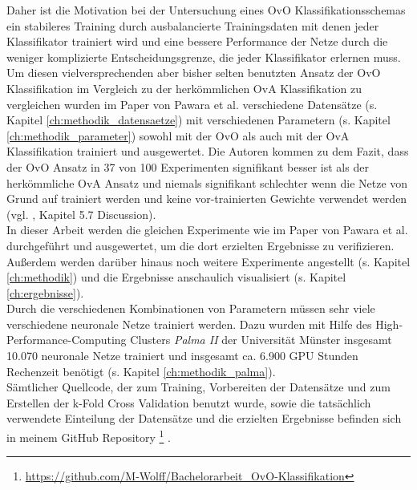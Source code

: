 Daher ist die Motivation bei der Untersuchung eines OvO Klassifikationsschemas ein stabileres Training durch ausbalancierte Trainingsdaten mit denen jeder Klassifikator trainiert wird und eine bessere Performance der Netze durch die weniger komplizierte  Entscheidungsgrenze, die jeder Klassifikator erlernen muss.\\

Um diesen vielversprechenden aber bisher selten benutzten Ansatz der OvO Klassifikation im Vergleich zu der herkömmlichen OvA Klassifikation zu vergleichen wurden im Paper von Pawara et al. \cite{pawaraPaper} verschiedene Datensätze (s. Kapitel \ref{ch:methodik_datensaetze}) mit verschiedenen Parametern (s. Kapitel \ref{ch:methodik_parameter}) sowohl mit der OvO als auch mit der OvA Klassifikation trainiert und ausgewertet.
Die Autoren kommen zu dem Fazit, dass der OvO Ansatz in 37 von 100 Experimenten signifikant besser ist als der herkömmliche OvA Ansatz und niemals signifikant schlechter wenn die Netze von Grund auf trainiert werden und keine vor-trainierten Gewichte verwendet werden (vgl. \cite{pawaraPaper}, Kapitel 5.7 Discussion).\\

In dieser Arbeit werden die gleichen Experimente wie im Paper von Pawara et al. \cite{pawaraPaper} durchgeführt und ausgewertet, um die dort erzielten Ergebnisse zu verifizieren. Außerdem werden darüber hinaus noch weitere Experimente angestellt (s. Kapitel \ref{ch:methodik}) und die Ergebnisse anschaulich visualisiert (s. Kapitel \ref{ch:ergebnisse}).\\

Durch die verschiedenen Kombinationen von Parametern müssen sehr viele verschiedene neuronale Netze trainiert werden. Dazu wurden mit Hilfe des High-Performance-Computing Clusters \textit{Palma II} der Universität Münster \cite{palma2} insgesamt 10.070 neuronale Netze trainiert und insgesamt ca. 6.900 GPU Stunden Rechenzeit benötigt (s. Kapitel \ref{ch:methodik_palma}).\\

Sämtlicher Quellcode, der zum Training, Vorbereiten der Datensätze und zum Erstellen der k-Fold Cross Validation benutzt wurde, sowie die tatsächlich verwendete Einteilung der Datensätze und die erzielten Ergebnisse befinden sich in meinem GitHub Repository \footnote{\url{https://github.com/M-Wolff/Bachelorarbeit_OvO-Klassifikation}} \cite{githubRepo}.